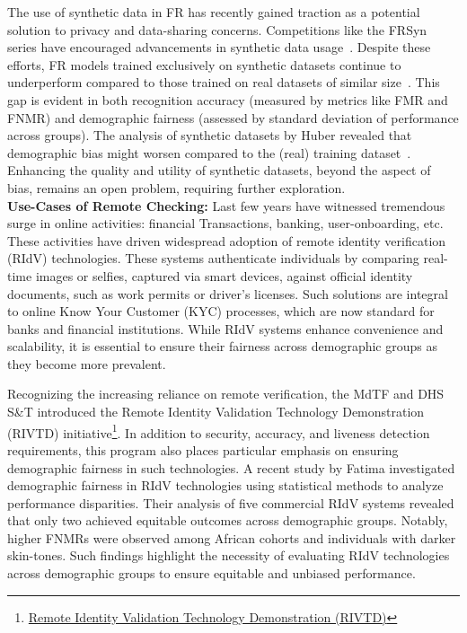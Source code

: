 The use of synthetic data in FR has recently gained traction as a potential
solution to privacy and data-sharing concerns. Competitions like the FRSyn
series have encouraged advancements in synthetic data
usage~\cite{melzi2024frcsyn1, deandres2024frcsyn, melzi2024frcsyn}. Despite
these efforts, FR models trained exclusively on synthetic datasets continue to
underperform compared to those trained on real datasets of similar
size~\cite{melzi2024frcsyn, george2024digi2real}. This gap is evident in both
recognition accuracy (measured by metrics like FMR and FNMR) and demographic
fairness (assessed by standard deviation of performance across groups). The
analysis of synthetic datasets by Huber \etal revealed that demographic bias
might worsen compared to the (real) training dataset~\cite{huber2024bias}.
Enhancing the quality and utility of synthetic datasets, beyond the aspect of
bias, remains an open problem, requiring further exploration.\\


\noindent\textbf{Use-Cases of Remote Checking:}
Last few years have witnessed tremendous surge in online activities: financial
Transactions, banking, user-onboarding, etc. These activities have driven
widespread adoption of remote identity verification (RIdV) technologies. These
systems authenticate individuals by comparing real-time images or selfies,
captured via smart devices, against official identity documents, such as work
permits or driver's licenses. Such solutions are integral to online Know Your
Customer (KYC) processes, which are now standard for banks and financial
institutions. While RIdV systems enhance convenience and scalability, it is
essential to ensure their fairness across demographic groups as they become more
prevalent.

Recognizing the increasing reliance on remote verification, the MdTF and DHS
S\&T introduced the Remote Identity Validation Technology Demonstration (RIVTD)
initiative\footnote{\href{https://mdtf.org/rivtd}{Remote Identity Validation
Technology Demonstration (RIVTD)}}. In addition to security, accuracy, and
liveness detection requirements, this program also places particular emphasis on
ensuring demographic fairness in such technologies.
%
A recent study by Fatima \etal\cite{fatima2024large} investigated demographic
fairness in RIdV technologies using statistical methods to analyze performance
disparities. Their analysis of five commercial RIdV systems revealed that only
two achieved equitable outcomes across demographic groups. Notably, higher FNMRs
were observed among African cohorts and individuals with darker skin-tones. Such
findings highlight the necessity of evaluating RIdV technologies across
demographic groups to ensure equitable and unbiased performance. \\

